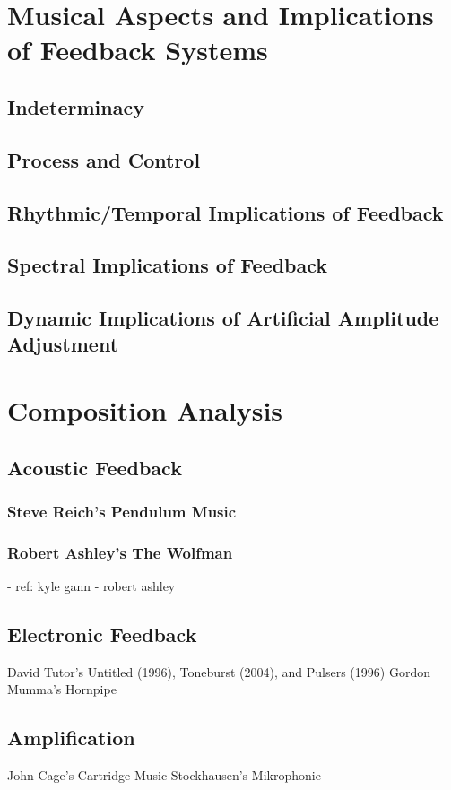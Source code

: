 \documentclass[titlepage]{scrartcl}
\begin{document}
    \section{Musical Aspects and Implications of Feedback Systems}
    \subsection{Indeterminacy}
    \subsection{Process and Control}
    \subsection{Rhythmic/Temporal Implications of Feedback}
    \subsection{Spectral Implications of Feedback}
    \subsection{Dynamic Implications of Artificial Amplitude Adjustment}

    \section{Composition Analysis}
    \subsection{Acoustic Feedback}
    \subsubsection{Steve Reich's Pendulum Music}
    \subsubsection{Robert Ashley's The Wolfman}\label{wolfman}
    - ref: kyle gann - robert ashley

    \subsection{Electronic Feedback}
        David Tutor's Untitled (1996), Toneburst (2004), and Pulsers (1996)
        Gordon Mumma's Hornpipe

    \subsection{Amplification}
        John Cage's Cartridge Music
        Stockhausen's Mikrophonie

    \printbibliography
\end{document}
